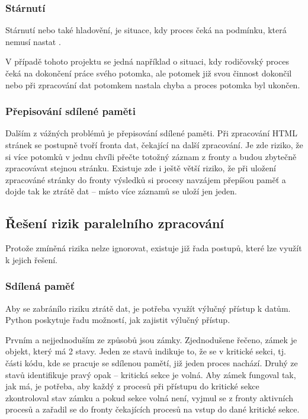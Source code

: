 \subsubsection{Stárnutí}
Stárnutí nebo také hladovění, je situace, kdy proces čeká na podmínku, která nemusí nastat \cite{SYNCPROCES}.

V případě tohoto projektu se jedná například o situaci, kdy rodičovský proces čeká na dokončení práce svého
potomka, ale potomek již svou činnost dokončil nebo při zpracování dat potomkem nastala chyba a proces potomka
byl ukončen.

\subsubsection{Přepisování sdílené paměti}
Dalším z vážných problémů je přepisování sdílené paměti. Při zpracování HTML stránek se postupně tvoří
fronta dat, čekající na další zpracování. Je zde riziko, že si více potomků v jednu chvíli přečte totožný
záznam z fronty a budou zbytečně zpracovávat stejnou stránku. Existuje zde i ještě větší riziko,
že při uložení zpracováné stránky do fronty výsledků si procesy navzájem přepíšou paměť a dojde tak
ke ztrátě dat -- místo více záznamů se uloží jen jeden.

\subsection{Řešení rizik paralelního zpracování}
\label{paralel_hazards}
Protože zmíněná rizika nelze ignorovat, existuje již řada postupů, které lze využít k jejich řešení.

\subsubsection{Sdílená paměť}
Aby se zabránílo riziku ztrátě dat, je potřeba využít výlučný přístup k datům. Python
poskytuje řadu možností, jak zajistit výlučný přístup.

Prvním a nejjednoduším ze způsobů jsou zámky. Zjednodušene řečeno, zámek je objekt, který má 2 stavy.
Jeden ze stavů indikuje to, že se v kritické sekci, tj. části kódu, kde se pracuje se sdílenou pamětí,
již jeden proces nachází. Druhý ze stavů identifikuje pravý opak -- kritická sekce je volná. Aby zámek
fungoval tak, jak má, je potřeba, aby každý z procesů při přístupu do kritické sekce zkontroloval stav
zámku a pokud sekce volná není, vyjmul se z fronty aktivních procesů a zařadil se do fronty čekajících
procesů na vstup do dané kritické sekce.


